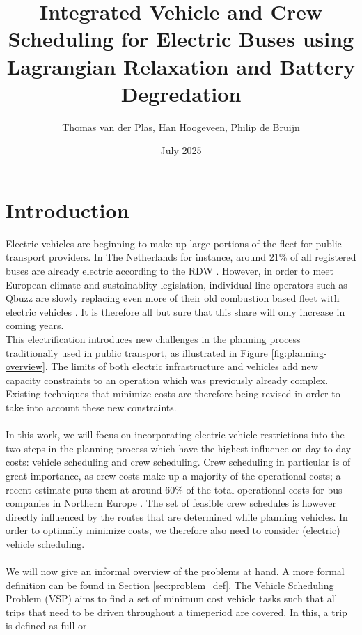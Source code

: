 \documentclass[]{article}
\title{Integrated Vehicle and Crew Scheduling for Electric Buses using Lagrangian Relaxation and Battery Degredation}
\date{July 2025}
\author{Thomas van der Plas, Han Hoogeveen, Philip de Bruijn}
\begin{document}
\maketitle

\section{Introduction}
Electric vehicles are beginning to make up large portions of the fleet for public transport providers. In
The Netherlands for instance, around 21\% of all registered buses are already electric
according to the RDW \cite{RDW}. However, in order to meet European climate and
sustainablity legislation, individual line operators such as Qbuzz are slowly
replacing even more of their old combustion based fleet with electric vehicles
\cite{europaRegulation20181999, qbuzzQbuzz}. It is therefore all but sure that this
share will only increase in coming years. \\
This electrification introduces new challenges in the planning process traditionally used in public transport, as illustrated in Figure \ref{fig:planning-overview}. The limits of both electric infrastructure and vehicles add new capacity constraints to an operation which was previously already complex. Existing techniques that minimize costs are therefore being revised in order
to take into account these new constraints.
\\\\ In this work, we will focus on incorporating electric vehicle restrictions
into the two steps in the planning process which have the highest influence on day-to-day costs: vehicle
scheduling and crew scheduling. Crew scheduling in particular is of great
importance, as crew costs make up a majority of the operational costs;
a recent estimate puts them at around $60\%$ of the total operational
costs for bus companies in Northern Europe \cite{Perumal2019Crew}. The set of
feasible crew schedules is however directly influenced by the routes that are
determined while planning vehicles. In order to optimally minimize costs, we therefore also need to consider (electric) vehicle scheduling. 
\\\\ We will now give an informal overview of the
problems at hand. A more formal definition can be found in Section
\ref{sec:problem_def}. The Vehicle Scheduling Problem (VSP) aims to find a set
of minimum cost vehicle tasks such that all trips that need to be driven
throughout a timeperiod are covered. In this, a trip is defined as full or
\end{document}
